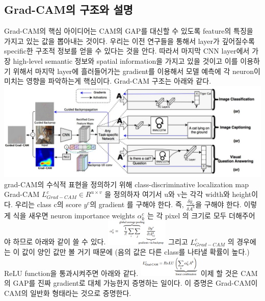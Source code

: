 \documentclass[extendedabs]{bmvc2k}
\begin{document}
 \subsection{Grad-CAM의 구조와 설명}
 \quad Grad-CAM의 핵심 아이디어는 CAM의 GAP를 대신할 수 있도록 feature의 특징을 가지고 있는 값을 뽑아내는 것이다. 우리는 이전 연구들을 통해서 layer가 깊어질수록 specific한 구조적 정보를 얻을 수 있다는 것을 안다. 
 따라서 마지막 CNN layer에서 가장 high-level semantic 정보와 spatial information을 가지고 있을 것이고 이를 이용하기 위해서 마지막 layer에 흘러들어가는 gradient를 이용해서 모델 예측에 
 각 neuron이 미치는 영향을 파악하는게 핵심이다. Grad-CAM 구조는 아래와 같다. 
 \newline  \includegraphics[width=\linewidth]{images/04_CAM.PNG}
 grad-CAM의 수식적 표현을 정의하기 위해 class-discriminative localization map Grad-CAM $L^c_{Grad-CAM} \in R^{ u \times v}$ 을 정의하자 여기서 u와 v는 각각 width와 height이다.
 우리는 class c의 score $y^c$의 gradient 를 구해야 한다. 즉, $\frac{\delta y_c}{\delta A^k}$을 구해야 한다. 이렇게 식을 새우면 neuron importance weights $\alpha^c_k$ 는 
 각 pixel 의 크기로 모두 더해주어야 하므로 아래와 같이 쓸 수 있다. 
 \newline  \includegraphics[width=3cm]{images/05_CAM.PNG}
 \newline 그리고 $L^c_{Grad-CAM}$ 의 경우에는 이 값이 양인 값만 볼 거기 때문에 (음의 값은 다른 class를 나타낼 확률이 높다.) ReLU function을 통과시켜주면 아래와 같다.
 \newline  \includegraphics[width=3cm]{images/06_CAM.PNG}
 \newline 이제 할 것은 CAM의 GAP를 진짜 gradient로 대체 가능한지 증명하는 일이다. 이 증명은 Grad-CAM이 CAM의 일반화 형태라는 것으로 증명한다.
\end{document}
